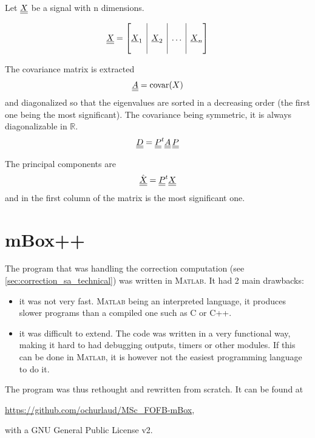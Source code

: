 Let $\underline{\underline{X}}$ be a signal with n dimensions.

\begin{equation}
\mat{X} = \left[
\begin{array}{@{}c|c|c|c@{}}
&&&\\ \vec{X}_1 & \vec{X}_2 & \dots & \vec{X}_n \\ &&&
\end{array}
\right]
\end{equation}

The covariance matrix is extracted
\begin{equation}
\underline{\underline{A}} = \text{covar}(X)
\end{equation}
and diagonalized so that the eigenvalues are sorted in a decreasing order (the first one being the most significant). The covariance being symmetric, it is always diagonalizable in $\mathbb{R}$.
\begin{equation}
\underline{\underline{D}} = \underline{\underline{P}}^{t} \underline{\underline{A}} \, \underline{\underline{P}}
\end{equation}

The principal components are
\begin{equation}
\hat{\underline{\underline{X}}} = \underline{\underline{P}}^{t} \underline{\underline{X}}
\end{equation}
and in the first column of the matrix is the most significant one.

\chapter{mBox++}
\label{apx:mbox}
The program that was handling the correction computation (see \cref{sec:correction_sa_technical}) was written in \textsc{Matlab}. It had 2 main drawbacks:
\begin{itemize}
    \item it was not very fast. \textsc{Matlab} being an interpreted language, it produces slower programs than a compiled one such as C or C++.
    \item it was difficult to extend. The code was written in a very functional way, making it hard to had debugging outputs, timers or other modules. If this can be done in \textsc{Matlab}, it is however not the easiest programming language to do it.
\end{itemize}

The program was thus rethought and rewritten from scratch. It can be found at
\begin{center}
    \url{https://github.com/ochurlaud/MSc_FOFB-mBox},
\end{center} 
with a GNU General Public License v2.

